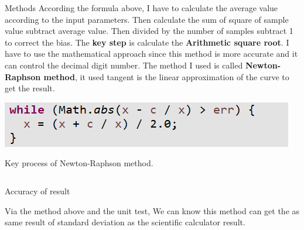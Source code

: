 \documentclass[final]{beamer}
\newlength{\onecolwid}
\newlength{\twocolwid}
\begin{document}
\begin{frame}[t]
\begin{columns}[t]
\begin{column}{\twocolwid}
\begin{columns}[t,totalwidth=\twocolwid]
\begin{column}{\onecolwid}
\begin{block}{Methods}
According the formula above, I have to calculate the average value according to the input parameters. Then calculate the sum of square of sample value subtract average value. Then divided by the number of samples subtract 1 to correct the bias. The \textbf{key step} is calculate the \textbf{Arithmetic square root}. I have to use the mathematical approach since this method is more accurate and it can control the decimal digit number. The method I used is called \textbf{Newton-Raphson method}, it used tangent is the linear approximation of the curve
to get the result.
\vspace{0.5cm}
\begin{center}
    \includegraphics[width=0.8\linewidth]{keyProcess.png}
\end{center}
Key process of Newton-Raphson method.
\end{block}


\end{column} %

\end{columns} %


\begin{alertblock}{Accuracy of result}

Via the method above and the unit test, We can know this method can get the as same result of standard deviation as the scientific calculator result.

\end{alertblock} 


\begin{columns}[t,totalwidth=\twocolwid] %


\end{columns}
\end{column}
\end{columns}
\end{frame}
\end{document}
